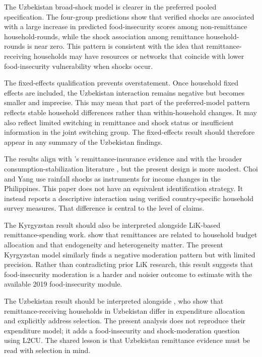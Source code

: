 \documentclass[11pt]{article}
\begin{document}
The Uzbekistan broad-shock model is clearer in the preferred pooled specification. The four-group predictions show that verified shocks are associated with a large increase in predicted food-insecurity scores among non-remittance household-rounds, while the shock association among remittance household-rounds is near zero. This pattern is consistent with the idea that remittance-receiving households may have resources or networks that coincide with lower food-insecurity vulnerability when shocks occur.

The fixed-effects qualification prevents overstatement. Once household fixed effects are included, the Uzbekistan interaction remains negative but becomes smaller and imprecise. This may mean that part of the preferred-model pattern reflects stable household differences rather than within-household changes. It may also reflect limited switching in remittance and shock status or insufficient information in the joint switching group. The fixed-effects result should therefore appear in any summary of the Uzbekistan findings.

The results align with \textcite{ChoiYang2007}'s remittance-insurance evidence and with the broader consumption-stabilization literature \parencite{CombesEbeke2011}, but the present design is more modest. Choi and Yang use rainfall shocks as instruments for income changes in the Philippines. This paper does not have an equivalent identification strategy. It instead reports a descriptive interaction using verified country-specific household survey measures. That difference is central to the level of claims.

The Kyrgyzstan result should also be interpreted alongside LiK-based remittance-spending work. \textcite{Wang2021} show that remittances are related to household budget allocation and that endogeneity and heterogeneity matter. The present Kyrgyzstan model similarly finds a negative moderation pattern but with limited precision. Rather than contradicting prior LiK research, this result suggests that food-insecurity moderation is a harder and noisier outcome to estimate with the available 2019 food-insecurity module.

The Uzbekistan result should be interpreted alongside \textcite{Kakhkharov2021}, who show that remittance-receiving households in Uzbekistan differ in expenditure allocation and explicitly address selection. The present analysis does not reproduce their expenditure model; it adds a food-insecurity and shock-moderation question using L2CU. The shared lesson is that Uzbekistan remittance evidence must be read with selection in mind.
\end{document}
